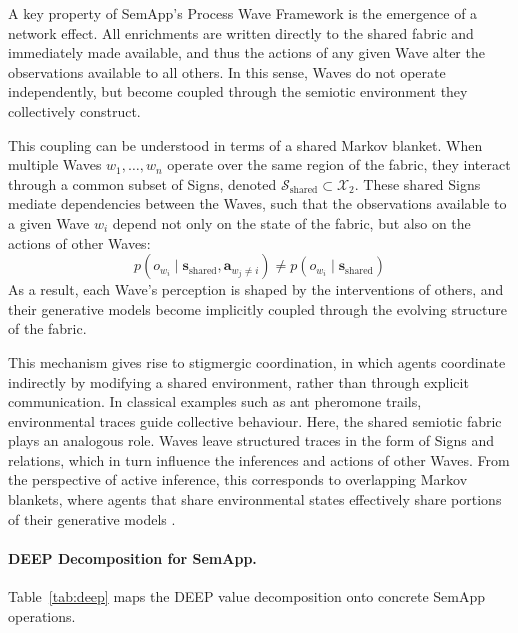 \documentclass[11pt,a4paper]{article}
\theoremstyle{definition}
\newcommand{\bp}{p}
\newcommand{\bs}{\bm{s}}
\newcommand{\ba}{\bm{a}}
\begin{document}
A key property of SemApp’s Process Wave Framework is the emergence of a network effect. All enrichments are written directly to the shared fabric and immediately made available, and thus the actions of any given Wave alter the observations available to all others. In this sense, Waves do not operate independently, but become coupled through the semiotic environment they collectively construct.

This coupling can be understood in terms of a shared Markov blanket. When multiple Waves $w_1, \ldots, w_n$ operate over the same region of the fabric, they interact through a common subset of Signs, denoted $\mathcal{S}_{\text{shared}} \subset \mathcal{X}_2$. These shared Signs mediate dependencies between the Waves, such that the observations available to a given Wave $w_i$ depend not only on the state of the fabric, but also on the actions of other Waves:
\begin{equation}
\bp(o_{w_i} \mid \bs_{\text{shared}}, \ba_{w_j \neq i}) \neq \bp(o_{w_i} \mid \bs_{\text{shared}})
\end{equation}
As a result, each Wave’s perception is shaped by the interventions of others, and their generative models become implicitly coupled through the evolving structure of the fabric.

This mechanism gives rise to stigmergic coordination, in which agents coordinate indirectly by modifying a shared environment, rather than through explicit communication. In classical examples such as ant pheromone trails, environmental traces guide collective behaviour. Here, the shared semiotic fabric plays an analogous role. Waves leave structured traces in the form of Signs and relations, which in turn influence the inferences and actions of other Waves. From the perspective of active inference, this corresponds to overlapping Markov blankets, where agents that share environmental states effectively share portions of their generative models \citep{albarracin2022epistemic}.

\paragraph{DEEP Decomposition for SemApp.} Table~\ref{tab:deep} maps the DEEP value decomposition onto concrete SemApp operations.
\end{document}
